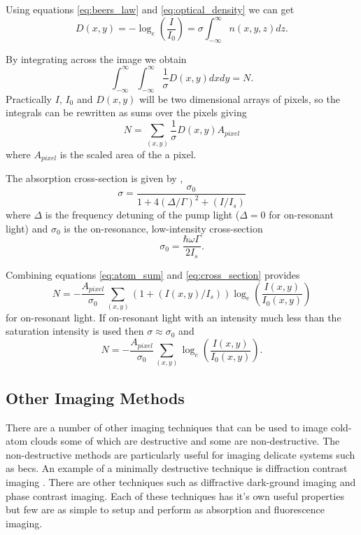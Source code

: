 Using equations \ref{eq:beers_law} and \ref{eq:optical_density} we can get
\begin{equation}
D(x, y) = -\log_e(\frac{I}{I_0}) = \sigma \int_{-\infty}^{\infty} n(x, y, z) dz.
\end{equation}

By integrating across the image we obtain
\begin{equation}
\int_{-\infty}^{\infty} \int_{-\infty}^{\infty} \frac{1}{\sigma}D(x, y) dx dy = N.
\end{equation}
Practically $I$, $I_0$ and $D(x, y)$ will be two dimensional arrays of pixels, so the integrals can be rewritten as sums over the pixels giving
\begin{equation}\label{eq:atom_sum}
N = \sum_{(x, y)} \frac{1}{\sigma}D(x, y)A_{pixel}
\end{equation}
where $A_{pixel}$ is the scaled area of the a pixel.

The absorption cross-section is given by \cite{steck_rubidium_2001},
\begin{equation}\label{eq:cross_section}
\sigma = \frac{\sigma_0}{1+4(\Delta/\Gamma)^2 + (I/I_s)}
\end{equation}
where $\Delta$ is the frequency detuning of the pump light ($\Delta=0$ for on-resonant light) and $\sigma_0$ is the on-resonance, low-intensity  cross-section
\begin{equation}
\sigma_0 = \frac{\hbar\omega\Gamma}{2I_s}.
\end{equation}

Combining equations \ref{eq:atom_sum} and \ref{eq:cross_section} provides
\begin{equation}
N = -\frac{A_{pixel}}{\sigma_0} \sum_{(x, y)} (1+(I(x, y)/I_s)) \log_e\left(\frac{I(x, y)}{I_0(x, y)}\right)
\end{equation}
for on-resonant light. If on-resonant light with an intensity much less than the saturation intensity is used then $\sigma \approx \sigma_0$ and
\begin{equation}
N = -\frac{A_{pixel}}{\sigma_0} \sum_{(x, y)} \log_e\left(\frac{I(x, y)}{I_0(x, y)}\right).
\end{equation}


\subsection{Other Imaging Methods}

There are a number of other imaging techniques that can be used to image cold-atom clouds some of which are destructive and some are non-destructive. The non-destructive methods are particularly useful for imaging delicate systems such as \glspl{bec}. An example of a minimally destructive technique is diffraction contrast imaging \cite{sheludko_excited-state_2007}. There are other techniques such as diffractive dark-ground imaging\cite{gregory-orfeus_diffractive_2011} and phase contrast imaging\cite{andrews_propagation_1997}. Each of these techniques has it's own useful properties but few are as simple to setup and perform as absorption and fluorescence imaging.


